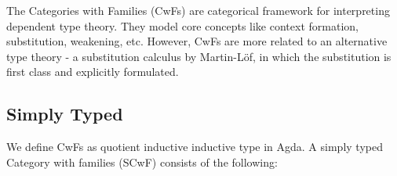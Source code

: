 \begin{code}[hide]
\AgdaSpace{}%
\AgdaSpace{}%
\AgdaSpace{}%
\AgdaSpace{}%
\<%
\\
\>[0]\AgdaSpace{}%
\AgdaSpace{}%
\AgdaSpace{}%
\AgdaSymbol{=}\AgdaSpace{}%
\AgdaSpace{}%
\AgdaSymbol{(}\AgdaSpace{}%
\AgdaSpace{}%
\AgdaSymbol{)}\<%
\\
%
\\[\AgdaEmptyExtraSkip]%
\>[0]\AgdaSpace{}%
\AgdaSpace{}%
\AgdaSpace{}%
\AgdaSymbol{:}\AgdaSpace{}%
\AgdaSpace{}%
\AgdaSpace{}%
\<%
\\
%
\\[\AgdaEmptyExtraSkip]%
\>[0]\AgdaSpace{}%
\AgdaSpace{}%
\<%
\\
\>[0]\AgdaSpace{}%
\AgdaSpace{}%
\<%
\\
\>[0]\AgdaSpace{}%
\AgdaSpace{}%
\AgdaOperator{\AgdaInductiveConstructor{\AgdaUnderscore{},\AgdaUnderscore{}}}\<%
\\
\>[0]\AgdaSpace{}%
\AgdaSpace{}%
\<%
\\
%
\\[\AgdaEmptyExtraSkip]%
\>[0]\AgdaSpace{}%
\AgdaSpace{}%
\<%
\end{code}

The Categories with Families (CwFs) are categorical framework for interpreting dependent type theory. They model core concepts like context formation, substitution, weakening, etc. However, CwFs are more related to an alternative type theory - a substitution calculus by Martin-Löf, in which the substitution is first class and explicitly formulated.

\subsection{Simply Typed}

We define CwFs as quotient inductive inductive type in Agda. A simply typed Category with families (SCwF) consists of the following:


